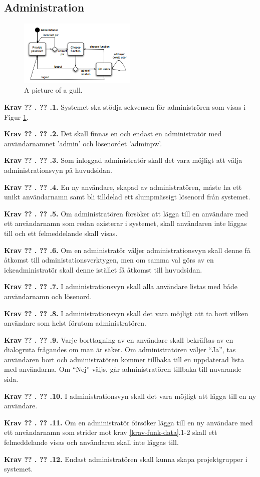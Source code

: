 \documentclass[a4paper]{article}
\newcommand\getcurrentref[1]{%
 \ifnumequal{\value{#1}}{0}
  {??}
  {\the\value{#1}}%
}
\newcommand\requirement[2]{
	\numberedrow{Krav}{#1}{#2}
}
\newcommand\numberedrow[3]{
	\noindent
	\textbf{#1 \getcurrentref{section}.\getcurrentref{subsection}.#2.} #3
	
}
\begin{document}
\subsection{Administration}
\begin{figure}[h!]
  \centering
    \includegraphics[width=0.5\textwidth]{admin_usage}
   \caption{A picture of a gull.}
   \label{image_admin_usage}
\end{figure}
\requirement{1}{Systemet ska stödja sekvensen för administrören som visas i Figur \ref{image_admin_usage}.}
\requirement{2}{Det skall finnas en och endast en administratör med användarnamnet 'admin' och lösenordet 'adminpw'.}
\requirement{3}{Som inloggad administratör skall det vara möjligt att välja administrationsvyn på huvudsidan.}
\requirement{4}{En ny användare, skapad av administratören, måste ha ett unikt användarnamn samt bli tilldelad ett slumpmässigt lösenord från systemet.}
\requirement{5}{Om administratören försöker att lägga till en användare med ett användarnamn som redan existerar i systemet, skall användaren inte läggas till och ett felmeddelande skall visas.}
\requirement{6}{Om en administratör väljer administrationsvyn skall denne få åtkomst till administationsverktygen, men om samma val görs av en ickeadministratör skall denne istället få åtkomst till huvudsidan.}
\requirement{7}{I administrationsvyn skall alla användare listas med både användarnamn och lösenord.}
\requirement{8}{I administrationsvyn skall det vara möjligt att ta bort vilken användare som helst förutom administratören.}
\requirement{9}{Varje borttagning av en användare skall bekräftas av en dialogruta frågandes om man är säker. Om administratören väljer ``Ja'', tas användaren bort och administratören kommer tillbaka till en uppdaterad lista med användarna. Om ``Nej'' väljs, går administratören tillbaka till nuvarande sida.}
\requirement{10}{I administrationsvyn skall det vara möjligt att lägga till en ny användare.}
\requirement{11}{Om en administratör försöker lägga till en ny användare med ett användarnamn som strider mot krav \ref{krav-funk-data}.1-2 skall ett felmeddelande visas och användaren skall inte läggas till.}
\requirement{12}{Endast administratören skall kunna skapa projektgrupper i systemet.}
\end{document}
